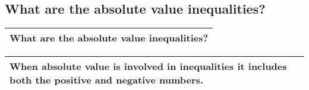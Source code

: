 \subsection{
What are the absolute value inequalities?}
\begin{small}
    \begin{tabularx}{1\textwidth}{
            p{}
        }
        \toprule
        What are the absolute value inequalities?
        \\
        \bottomrule
    \end{tabularx}
\end{small}
\begin{small}
    \begin{tabularx}{1\textwidth}{
            p{}
        }
        \toprule
        When absolute value is involved in inequalities it includes both the
        positive and negative numbers.
        \\
        \bottomrule
    \end{tabularx}
\end{small}
